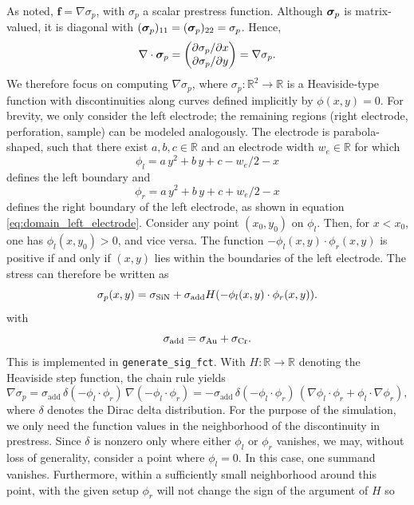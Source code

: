 As noted, $\mathbf{f} = \nabla \sigma_p$, with $\sigma_p$ a scalar prestress function. Although $\boldsymbol{\sigma}_p$ is matrix-valued, it is diagonal with $(\boldsymbol{\sigma}_p)_{11}=(\boldsymbol{\sigma}_p)_{22} = \sigma_p$. Hence,
\begin{equation*}
    \nabla\cdot\boldsymbol{\sigma}_p =
    \begin{pmatrix}
        \partial \sigma_p / \partial x \\
        \partial \sigma_p / \partial y
    \end{pmatrix}
    = \nabla \sigma_p.
\end{equation*}
We therefore focus on computing $\nabla \sigma_p$, where $\sigma_p:\mathbb{R}^2 \to \mathbb{R}$ is a Heaviside-type function with discontinuities along curves defined implicitly by $\phi(x,y)=0$. For brevity, we only consider the left electrode; the remaining regions (right electrode, perforation, sample) can be modeled analogously. The electrode is parabola-shaped, such that there exist $a,b,c\in\mathbb{R}$ and an electrode width $w_e\in\mathbb{R}$ for which
\[
\phi_l=a\,y^2+b\,y+c-w_e/2-x
\]
defines the left boundary and
\[
\phi_r=a\,y^2+b\,y+c+w_e/2-x
\]
defines the right boundary of the left electrode, as shown in equation \eqref{eq:domain_left_electrode}. Consider any point $(x_0,y_0)$ on $\phi_l$. Then, for $x<x_0$, one has $\phi_l(x,y_0)>0$, and vice versa. The function $-\phi_l(x,y)\cdot \phi_r(x,y)$ is positive if and only if $(x,y)$ lies within the boundaries of the left electrode. The stress can therefore be written as
\[
\sigma_p(x,y) = \sigma_{\mathrm{SiN}} + \sigma_{\mathrm{add}} H(-\phi_l(x,y)\cdot \phi_r(x,y)) .
\]
with
\[
\sigma_\mathrm{add}=\sigma_{\mathrm{Au}} + \sigma_{\mathrm{Cr}}.
\]
This is implemented in \texttt{generate\_sig\_fct}. With $H:\mathbb{R}\to\mathbb{R}$ denoting the Heaviside step function, the chain rule yields
\begin{equation*}
    \nabla \sigma_p = \sigma_{\mathrm{add}}\, \delta(-\phi_l\cdot \phi_r)\, \nabla(- \phi_l\cdot \phi_r)=-\sigma_{\mathrm{add}}\, \delta(-\phi_l\cdot \phi_r)\, ( \nabla\phi_l\cdot \phi_r+\phi_l\cdot \nabla\phi_r),
\end{equation*}
where $\delta$ denotes the Dirac delta distribution. For the purpose of the simulation, we only need the function values in the neighborhood of the discontinuity in prestress. Since $\delta$ is nonzero only where either $\phi_l$ or $\phi_r$ vanishes, we may, without loss of generality, consider a point where $\phi_l=0$. In this case, one summand vanishes. Furthermore, within a sufficiently small neighborhood around this point, with the given setup $\phi_r$ will not change the sign of the argument of $H$ so
